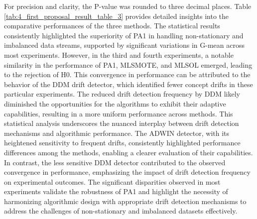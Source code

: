 For precision and clarity, the P-value was rounded to three decimal places.
Table \ref{tab:4_first_proposal_result_table_3} provides detailed insights into the comparative performances of the three methods. The statistical results consistently highlighted the superiority of PA1 in handling non-stationary and imbalanced data streams, supported by significant variations in G-mean across most experiments. However, in the third and fourth experiments, a notable similarity in the performance of PA1, MLSMOTE, and MLSOL emerged, leading to the rejection of H0. This convergence in performance can be attributed to the behavior of the DDM drift detector, which identified fewer concept drifts in these particular experiments. The reduced drift detection frequency by DDM likely diminished the opportunities for the algorithms to exhibit their adaptive capabilities, resulting in a more uniform performance across methods. This statistical analysis underscores the nuanced interplay between drift detection mechanisms and algorithmic performance. The ADWIN detector, with its heightened sensitivity to frequent drifts, consistently highlighted performance differences among the methods, enabling a clearer evaluation of their capabilities. In contrast, the less sensitive DDM detector contributed to the observed convergence in performance, emphasizing the impact of drift detection frequency on experimental outcomes. The significant disparities observed in most experiments validate the robustness of PA1 and highlight the necessity of harmonizing algorithmic design with appropriate drift detection mechanisms to address the challenges of non-stationary and imbalanced datasets effectively.
